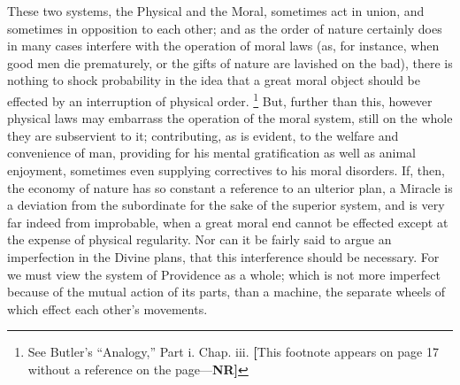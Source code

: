 These two systems, the Physical and the Moral,
sometimes act in union, and sometimes in opposition to each other; and
as the order of nature certainly does in many cases interfere with the
operation of moral laws (as, for instance, when good men die
prematurely, or the gifts of nature are lavished on the bad), there is
nothing to shock probability in the idea that a great moral object
should be effected by an interruption of physical order. \footnote{See Butler's
``Analogy,'' Part i. Chap.
iii. \textbf{[}This footnote appears on
page 17 without a reference on the page—\textbf{NR]}} But, further than this, however physical laws may embarrass the
operation of the moral system, still on the whole they are subservient
to it; contributing, as is evident, to the welfare and convenience of
man, providing for his mental gratification as well as animal
enjoyment, sometimes even supplying correctives to his moral
disorders. If, then, the economy of nature has so constant a reference
to an ulterior plan, a Miracle is a deviation from the
subordinate for the sake of the superior system, and is very far
indeed from improbable, when a great moral end cannot be effected
except at the expense of physical regularity. Nor can it be fairly
said to argue an imperfection in the Divine plans, that this
interference should be necessary. For we must view the system of
Providence as a whole; which is not more imperfect because of the
mutual action of its parts, than a machine, the separate wheels of
which effect each other's movements.

